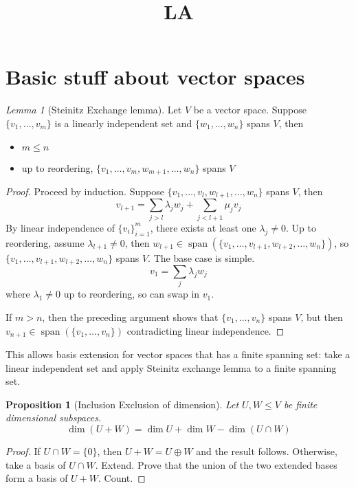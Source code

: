 \documentclass{article}
\title{LA}
\author{ }
\date{ }
\theoremstyle{definition}
\theoremstyle{remark}
\newtheorem{lem}[defn]{Lemma}
\theoremstyle{plain}
\newtheorem{prop}[defn]{Proposition}
\begin{document}
\maketitle

\section{Basic stuff about vector spaces}
\begin{lem}[Steinitz Exchange lemma]
    Let $V$ be a vector space. Suppose $\{v_1,\ldots,v_m\}$ is a linearly independent set and $\{w_1,\ldots,w_n\}$ spans $V$, then
    \begin{itemize}
        \item $m\le n$
        \item up to reordering, $\{v_1,\ldots,v_m,w_{m+1},\ldots,w_n\}$ spans $V$
    \end{itemize}
\end{lem}
\begin{proof}
    Proceed by induction. Suppose $\{v_1,\ldots,v_l,w_{l+1},\ldots,w_n\}$ spans $V$, then \[v_{l+1}=\sum_{j>l}\lambda_jw_j+\sum_{j<l+1}\mu_jv_j\]
    By linear independence of $\{v_i\}_{i=1}^m$, there exists at least one $\lambda_j\neq 0$. Up to reordering, assume $\lambda_{l+1}\neq 0$, then $w_{l+1}\in\operatorname{span}(\{v_1,\ldots,v_{l+1},w_{l+2},\ldots,w_n\})$, so $\{v_1,\ldots,v_{l+1},w_{l+2},\ldots,w_n\}$ spans $V$. The base case is simple. 
    \[v_1=\sum_{j}\lambda_jw_j\]
    where $\lambda_1\neq 0$ up to reordering, so can swap in $v_1$.

    If $m>n$, then the preceding argument shows that $\{v_1,\ldots,v_n\}$ spans $V$, but then $v_{n+1}\in\operatorname{span}(\{v_1,\ldots,v_n\})$ contradicting linear independence.
\end{proof}
This allows basis extension for vector spaces that has a finite spanning set: take a linear independent set and apply Steinitz exchange lemma to a finite spanning set.
\begin{prop}[Inclusion Exclusion of dimension]
    Let $U,W\le V$ be finite dimensional subspaces. 
    \[\dim(U+W)=\dim U+\dim W-\dim(U\cap W)\]
\end{prop}
\begin{proof}
    If $U\cap W=\{0\}$, then $U+W=U\oplus W$ and the result follows. Otherwise, take a basis of $U\cap W$. Extend. Prove that the union of the two extended bases form a basis of $U+W$. Count.
\end{proof}
\end{document}
